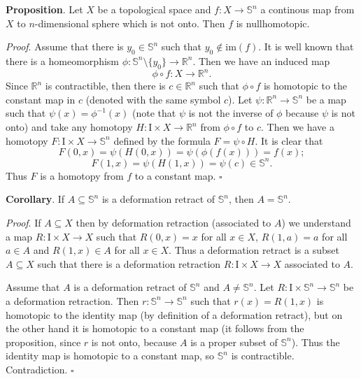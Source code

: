 \documentclass[12pt]{article}
\begin{document}
\textbf{Proposition}. Let $X$ be a topological space and $f:X\to\mathbb{S}^{n}$ a continous map from $X$ to $n$-dimensional sphere which is not onto. Then $f$ is nullhomotopic.

\textit{Proof}. Assume that there is $y_0\in\mathbb{S}^{n}$ such that $y_0\not\in\mathrm{im}(f)$. It is well known that there is a homeomorphism $\phi:\mathbb{S}^{n}\setminus\{y_{0}\}\to\mathbb{R}^{n}$. Then we have an induced map
$$\phi\circ f:X\to\mathbb{R}^{n}.$$
Since $\mathbb{R}^{n}$ is contractible, then there is $c\in\mathbb{R}^{n}$ such that $\phi\circ f$ is homotopic to the constant map in $c$ (denoted with the same symbol $c$). Let $\psi:\mathbb{R}^{n}\to\mathbb{S}^{n}$ be a map such that $\psi(x)=\phi^{-1}(x)$ (note that $\psi$ is not the inverse of $\phi$ because $\psi$ is not onto) and take any homotopy $H:\mathrm{I}\times X\to\mathbb{R}^{n}$ from $\phi\circ f$ to $c$. Then we have a homotopy $F:\mathrm{I}\times X\to\mathbb{S}^{n}$ defined by the formula $F=\psi\circ H$. It is clear that
$$F(0,x)=\psi (H(0,x))=\psi(\phi(f(x))) = f(x);$$
$$F(1,x)=\psi (H(1,x))=\psi(c)\in\mathbb{S}^{n}.$$
Thus $F$ is a homotopy from $f$ to a constant map. $\square$

\textbf{Corollary}. If $A\subseteq\mathbb{S}^{n}$ is a deformation retract of $\mathbb{S}^{n}$, then $A=\mathbb{S}^{n}$.

\textit{Proof}. If $A\subseteq X$ then by deformation retraction (associated to $A$) we understand a map $R:\mathrm{I}\times X\to X$ such that $R(0,x)=x$ for all $x\in X$, $R(1,a)=a$ for all $a\in A$ and $R(1,x)\in A$ for all $x\in X$. Thus a deformation retract is a subset $A\subseteq X$ such that there is a deformation retraction $R:\mathrm{I}\times X\to X$ associated to $A$.

Assume that $A$ is a deformation retract of $\mathbb{S}^{n}$ and $A\neq\mathbb{S}^{n}$. Let $R:\mathrm{I}\times\mathbb{S}^{n}\to \mathbb{S}^{n}$ be a deformation retraction. Then $r:\mathbb{S}^{n}\to\mathbb{S}^{n}$ such that $r(x)=R(1,x)$ is homotopic to the identity map (by definition of a deformation retract), but on the other hand it is homotopic to a constant map (it follows from the proposition, since $r$ is not onto, because $A$ is a proper subset of $\mathbb{S}^{n}$). Thus the identity map is homotopic to a constant map, so $\mathbb{S}^{n}$ is contractible. Contradiction. $\square$
\end{document}
